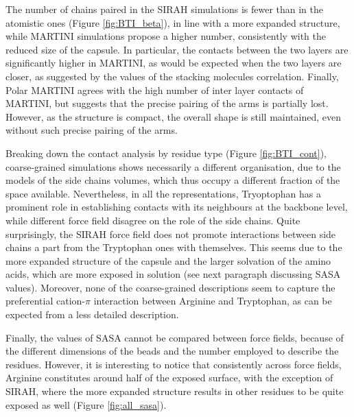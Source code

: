 The number of chains paired in the SIRAH simulations is fewer than in the atomistic ones (Figure \ref{fig:BTI_beta}), in line with a more expanded structure, while MARTINI simulations propose a higher number, consistently with the reduced size of the capsule. In particular, the contacts between the two layers are significantly higher in MARTINI, as would be expected when the two layers are closer, as suggested by the values of the stacking molecules correlation. Finally, Polar MARTINI agrees with the high number of inter layer contacts of MARTINI, but suggests that the precise pairing of the arms is partially lost. However, as the structure is compact, the overall shape is still maintained, even without such precise pairing of the arms.

Breaking down the contact analysis by residue type (Figure \ref{fig:BTI_cont}), coarse-grained simulations shows necessarily a different organisation, due to the models of the side chains volumes, which thus occupy a different fraction of the space available.
%
Nevertheless, in all the representations, Tryoptophan has a prominent role in establishing contacts with its neighbours at the backbone level, while different force field disagree on the role of the side chains. Quite surprisingly, the SIRAH force field does not promote interactions between side chains a part from the Tryptophan ones with themselves. This seems due to the more expanded structure of the capsule and the larger solvation of the amino acids, which are more exposed in solution (see next paragraph discussing SASA values).
%
Moreover, none of the coarse-grained descriptions seem to capture the preferential cation-$\pi$ interaction between Arginine and Tryptophan, as can be expected from a less detailed description.

Finally, the values of SASA cannot be compared between force fields, because of the different dimensions of the beads and the number employed to describe the residues. However, it is interesting to notice that consistently across force fields, Arginine constitutes around half of the exposed surface, with the exception of SIRAH, where the more expanded structure results in other residues to be quite exposed as well (Figure \ref{fig:all_sasa}).

